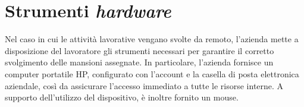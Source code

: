 \section{Strumenti \textit{hardware}}
Nel caso in cui le attività lavorative vengano svolte da remoto, l'azienda mette a disposizione del lavoratore gli strumenti necessari per garantire il corretto svolgimento delle mansioni assegnate.
In particolare, l'azienda fornisce un computer portatile HP, configurato con l'account e la casella di posta elettronica aziendale, così da assicurare l'accesso immediato a tutte le risorse interne.
A supporto dell'utilizzo del dispositivo, è inoltre fornito un mouse.